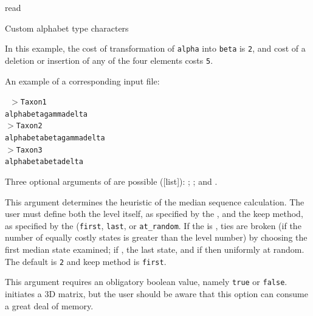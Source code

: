 \begin{command}{read}{}
\begin{arguments}
\begin{argumentgroup}{Custom alphabet type characters}
{                In this example, the cost of transformation of \texttt{alpha}
                into \texttt{beta} is \texttt{2}, and cost of a deletion or
                insertion of any of the four elements costs \texttt{5}.
           
                An example of a corresponding input file:
       
                \texttt{
                    $>$Taxon1\\
                    alphabetagammadelta\\
                    $>$Taxon2\\
                    alphabetabetagammadelta\\
                    $>$Taxon3\\
                    alphabetabetadelta}
    
                Three optional arguments of  are
                possible ([\poylident list]): ;
                ; and .

                \begin{description}
                        {This argument determines the heuristic  of the median sequence calculation.  
                        The user must define both the level itself, as specified by the \poyint, and the keep method, as specified 
                        by the \poylident (\texttt{first}, \texttt{last}, or \texttt{at\_random}.  If the \poylident is , 
                        ties are broken (if the number of equally costly states is greater than the level number) by choosing the 
                        first median state examined; if , the last state, and if 
                         then uniformly at random. The default      is \texttt{2} and keep method is \texttt{first}.  }
                        {}
                        
                     {\obligatory \poybool}
                        {This argument requires an obligatory boolean value, namely \texttt{true} or \texttt{false}.
                          initiates a 3D matrix, but the user should be aware 
                        that this option can consume a great deal of memory.}
                        {}
                        

\end{description}}
\end{argumentgroup}
\end{arguments}
\end{command}
